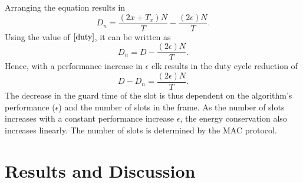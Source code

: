 \documentclass[a4paper,10pt]{report}
\begin{document}
Arranging the equation results in
\begin{equation}
D_n= \frac{(2x+T_x)N}{T} - \frac{(2\epsilon)N}{T}.
\end{equation}
Using the value of $\ref{duty}$, it can be written as
\begin{equation}
D_n= D - \frac{(2\epsilon)N}{T}.
\end{equation}
Hence, with a performance increase in $\epsilon$ clk results in the
duty cycle reduction of
\begin{equation}
D - D_n = \frac{(2\epsilon)N}{T}.
\end{equation}
The decrease in the guard time of the slot is thus dependent on the
algorithm's performance ($\epsilon$) and the number of slots in the
frame. As the number of slots increases with a constant performance increase $\epsilon$, the energy conservation
also increases linearly. The number of slots is determined by the
MAC protocol.
\chapter{\textbf{Results and Discussion}}
\end{document}

